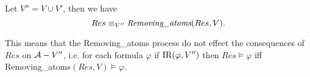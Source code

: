 \documentclass[letterpaper]{article}
\begin{document}
\begin{proposition}\label{pro:remove}
Let $V''=V \cup V'$, then we have
 \[
   Res \equiv_{V''}  \emph{Removing\_atoms}(Res, V).
 \]
\end{proposition}
This means that the Removing\_atoms process do not effect the consequences of $Res$ on ${\cal A} - V''$, i.e. for each formula $\varphi$ if $\textrm{IR}(\varphi, V'')$ then $Res \models \varphi$ iff Removing\_atoms$(Res, V)\models \varphi$.





\end{document}
